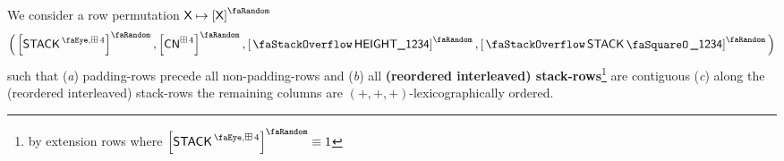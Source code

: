 We consider a row permutation $\col{X}\mapsto\order{\col{X}}$
\[
	\Big(
	\order{\peekStackFour},
	\order{\cn^{\cc4}},
	\order{\stackItemHeight{\col{1234}}},
	\order{\stackItemStamp{\col{1234}}}
	\Big)
\]
\noindent such that
(\emph{a}) padding-rows precede all non-padding-rows and
(\emph{b}) all \textbf{(reordered interleaved) stack-rows}\footnote{by extension rows where $\order{\peekStackFour} \equiv 1$} are contiguous
(\emph{c}) along the (reordered interleaved) stack-rows the remaining columns are $(+, +, +)$-lexicographically ordered.
